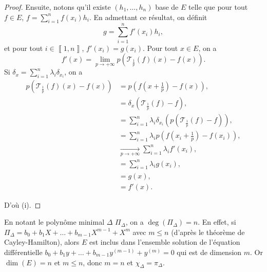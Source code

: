 \documentclass[12pt]{article}
\begin{document}
\begin{proof}
	Ensuite, notons qu'il existe $(h_1,\dots,h_n)$ base de $E$ telle que pour tout $f\in E$, $f=\sum_{i=1}^{n}f(x_i)h_i$. En admettant ce résultat, on définit 
	\begin{equation*}
		g=\sum_{i=1}^{n}f'(x_i)h_i,
	\end{equation*}
	et pour tout $i\in\left\llbracket1,n\right\rrbracket$, $f'(x_i)=g(x_i)$. Pour tout $x\in E$, on a 
	\begin{equation*}
		f'(x)=\lim\limits_{p\to+\infty}p\left(\mathcal{T}_{\frac{1}{p}}(f)(x)-f(x)\right).
	\end{equation*}
	Si $\delta_x=\sum_{i=1}^{n}\lambda_i \delta_{x_i}$, on a 
	\begin{align*}
		p\left(\mathcal{T}_{\frac{1}{p}}(f)(x)-f(x)\right)
		&=p\left(f\left(x+\frac{1}{p}\right)-f(x)\right),\\
		&=\delta_x\left(\mathcal{T}_{\frac{1}{p}}(f)-f\right),\\
		&=\sum_{i=1}^{n}\lambda_i\delta_{x_i}\left(p\left(\mathcal{T}_{\frac{1}{p}}(f)-f\right)\right),\\
		&=\sum_{i=1}^{n}\lambda_i p\left(f\left(x_i+\frac{1}{p}\right)-f(x_i)\right),\\
		&\xrightarrow[p\to+\infty]{}\sum_{i=1}^{n}\lambda_i f'(x_i),\\
		&=\sum_{i=1}^{n}\lambda_i g(x_i),\\
		&=g(x),\\
		&=f'(x).
	\end{align*}

	D'où (i).
\end{proof}

\begin{remark}
	En notant le polynôme minimal $\Delta$ $\Pi_{\Delta}$, on a $\deg(\Pi_{\Delta})=n$. En effet, si $\Pi_{\Delta}=b_0+b_1 X+\dots+b_{m-1}X^{m-1}+X^{m}$ avec $m\leqslant n$ (d'après le théorème de Cayley-Hamilton), alors $E$ est inclus dans l'ensemble solution de l'équation différentielle $b_0+b_1 y+\dots+b_{m-1}y^{(m-1)}+y^{(m)}=0$ qui est de dimension $m$. Or $\dim(E)=n$ et $m\leqslant n$, donc $m=n$ et $\chi_{\Delta}=\pi_{\Delta}$.
\end{remark}
\end{document}
